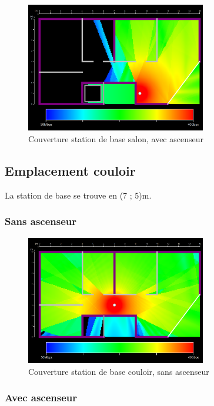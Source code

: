 \begin{figure}[H]
    \centering
    \includegraphics[width=0.7\textwidth]{latex/images/highres-with-lift.png}
    \caption{Couverture station de base salon, avec ascenseur}
    \label{fig:simu-emplacement-defaut-avecasc}
\end{figure}

\subsection{Emplacement couloir}
La station de base se trouve en (7 ; 5)m.

\subsubsection{Sans ascenseur}

\begin{figure}[H]
    \centering
    \includegraphics[width=0.7\textwidth]{latex/images/highres-couloir-without-lift.png}
    \caption{Couverture station de base couloir, sans ascenseur}
    \label{fig:simu-emplacement-couloir-sansasc}
\end{figure}
\subsubsection{Avec ascenseur}

